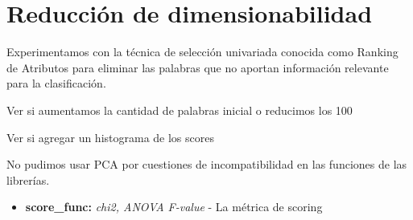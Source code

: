 \section{Reducción de dimensionabilidad}
Experimentamos con la técnica de selección univariada conocida como Ranking de Atributos para eliminar las palabras que no aportan información relevante para la clasificación. 

{\Large Ver si aumentamos la cantidad de palabras inicial o reducimos los 100}

{\Large Ver si agregar un histograma de los scores}

No pudimos usar PCA por cuestiones de incompatibilidad en las funciones de las librerías. 
\begin{itemize}
\item \textbf{score\_func:} \textit{chi2, ANOVA F-value} - La métrica de scoring
\end{itemize}